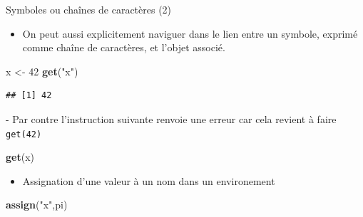 \documentclass[
  ignorenonframetext,
]{beamer}
\newenvironment{Shaded}{\begin{snugshade}}{\end{snugshade}}
\newcommand{\DecValTok}[1]{\textcolor[rgb]{0.00,0.00,0.81}{#1}}
\newcommand{\FunctionTok}[1]{\textcolor[rgb]{0.13,0.29,0.53}{\textbf{#1}}}
\newcommand{\NormalTok}[1]{#1}
\newcommand{\OtherTok}[1]{\textcolor[rgb]{0.56,0.35,0.01}{#1}}
\newcommand{\StringTok}[1]{\textcolor[rgb]{0.31,0.60,0.02}{#1}}
\providecommand{\tightlist}{%
  \setlength{\itemsep}{0pt}\setlength{\parskip}{0pt}}
\begin{document}
\begin{frame}[fragile]{Symboles ou chaînes de caractères (2)}
\protect\hypertarget{symboles-ou-chauxeenes-de-caractuxe8res-2}{}
\begin{itemize}
\tightlist
\item
  On peut aussi explicitement naviguer dans le lien entre un symbole,
  exprimé comme chaîne de caractères, et l'objet associé.
\end{itemize}

\tiny

\begin{Shaded}
\begin{Highlighting}[]
\NormalTok{x }\OtherTok{\textless{}{-}} \DecValTok{42}
\FunctionTok{get}\NormalTok{(}\StringTok{"x"}\NormalTok{)}
\end{Highlighting}
\end{Shaded}

\begin{verbatim}
## [1] 42
\end{verbatim}

\normalsize - Par contre l'instruction suivante renvoie une erreur car
cela revient à faire \texttt{get(42)}

\tiny

\begin{Shaded}
\begin{Highlighting}[]
\FunctionTok{get}\NormalTok{(x)}
\end{Highlighting}
\end{Shaded}

\normalsize

\begin{itemize}
\tightlist
\item
  Assignation d'une valeur à un nom dans un environement
\end{itemize}

\tiny

\begin{Shaded}
\begin{Highlighting}[]
\FunctionTok{assign}\NormalTok{(}\StringTok{"x"}\NormalTok{,pi)}
\end{Highlighting}
\end{Shaded}

\normalsize
\end{frame}
\end{document}

